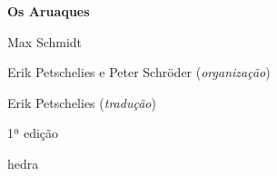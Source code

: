 




\begingroup\thispagestyle{empty}\vspace*{.05\textheight} 

              \formular
              \Huge
              \noindent
              \textbf{Os Aruaques}

              \bigskip  
              
              \LARGE
              \noindent
              Max Schmidt
              \vspace{6.9em}
              
              \newfontfamily{}
              {\selectfont\minion\small\noindent Erik Petschelies e Peter Schröder (\textit{organização})\\\vspace*{-.7cm}

              \noindent Erik Petschelies (\textit{tradução})}

              \bigskip

              \noindent
              {\selectfont\minion\small\noindent 1ª edição}

              \vfill

              \newfontfamily{}
              {\noindent\fontsize{30}{40}\selectfont \timesnewroman hedra}

              \vspace{-0.3em}

\endgroup
\pagebreak
